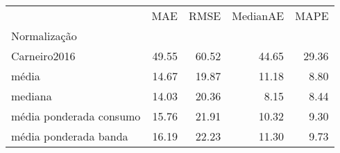 \begin{tabular}{lrrrr}
\toprule
 & MAE & RMSE & MedianAE & MAPE \\
Normalização &  &  &  &  \\
\midrule
Carneiro2016 & 49.55 & 60.52 & 44.65 & 29.36 \\
média & 14.67 & 19.87 & 11.18 & 8.80 \\
mediana & 14.03 & 20.36 & 8.15 & 8.44 \\
média ponderada consumo & 15.76 & 21.91 & 10.32 & 9.30 \\
média ponderada banda & 16.19 & 22.23 & 11.30 & 9.73 \\
\bottomrule
\end{tabular}
